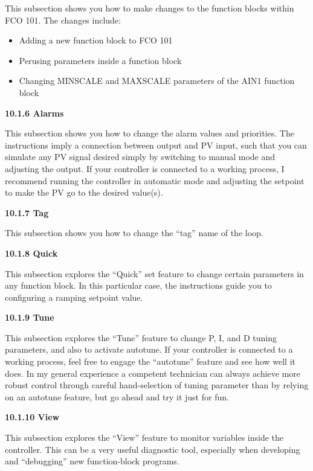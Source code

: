 This subsection shows you how to make changes to the function blocks within FCO 101.  The changes include:

\begin{itemize}
\item{} Adding a new function block to FCO 101
\item{} Perusing parameters inside a function block
\item{} Changing MINSCALE and MAXSCALE parameters of the AIN1 function block
\end{itemize}

\vskip 30pt

\noindent
{\bf 10.1.6 Alarms}

This subsection shows you how to change the alarm values and priorities.  The instructions imply a connection between output and PV input, such that you can simulate any PV signal desired simply by switching to manual mode and adjusting the output.  If your controller is connected to a working process, I recommend running the controller in automatic mode and adjusting the setpoint to make the PV go to the desired value(s).

\filbreak

\vskip 30pt

\noindent
{\bf 10.1.7 Tag}

This subsection shows you how to change the ``tag'' name of the loop.

\vskip 30pt

\noindent
{\bf 10.1.8 Quick}

This subsection explores the ``Quick'' set feature to change certain parameters in any function block.  In this particular case, the instructions guide you to configuring a ramping setpoint value.

\vskip 30pt

\noindent
{\bf 10.1.9 Tune}

This subsection explores the ``Tune'' feature to change P, I, and D tuning parameters, and also to activate autotune.  If your controller is connected to a working process, feel free to engage the ``autotune'' feature and see how well it does.  In my general experience a competent technician can always achieve more robust control through careful hand-selection of tuning parameter than by relying on an autotune feature, but go ahead and try it just for fun.

\vskip 30pt

\noindent
{\bf 10.1.10 View}

This subsection explores the ``View'' feature to monitor variables inside the controller.  This can be a very useful diagnostic tool, especially when developing and ``debugging'' new function-block programs.

